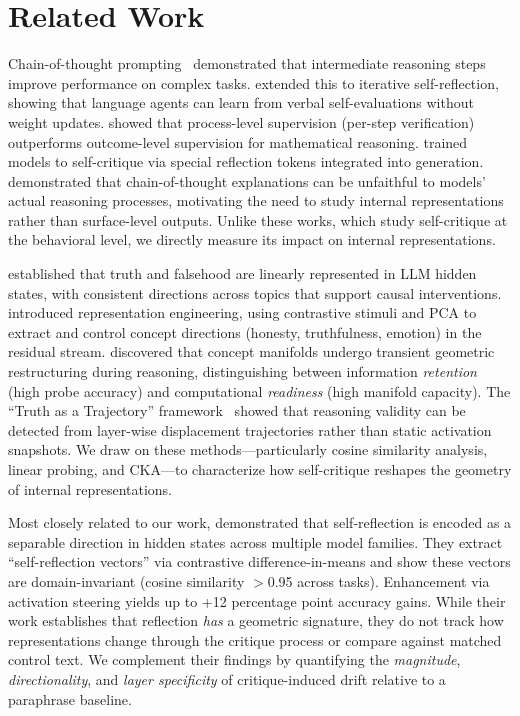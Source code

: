 \section{Related Work}
\label{sec:related}

Chain-of-thought prompting~\citep{wei2022chain} demonstrated that intermediate reasoning steps improve performance on complex tasks. \citet{shinn2023reflexion} extended this to iterative self-reflection, showing that language agents can learn from verbal self-evaluations without weight updates. \citet{lightman2023lets} showed that process-level supervision (per-step verification) outperforms outcome-level supervision for mathematical reasoning. \citet{asai2023self} trained models to self-critique via special reflection tokens integrated into generation. \citet{turpin2024language} demonstrated that chain-of-thought explanations can be unfaithful to models' actual reasoning processes, motivating the need to study internal representations rather than surface-level outputs. Unlike these works, which study self-critique at the behavioral level, we directly measure its impact on internal representations.

\citet{marks2024geometry} established that truth and falsehood are linearly represented in LLM hidden states, with consistent directions across topics that support causal interventions. \citet{zou2023representation} introduced representation engineering, using contrastive stimuli and PCA to extract and control concept directions (honesty, truthfulness, emotion) in the residual stream. \citet{polo2026emergent} discovered that concept manifolds undergo transient geometric restructuring during reasoning, distinguishing between information \emph{retention} (high probe accuracy) and computational \emph{readiness} (high manifold capacity). The ``Truth as a Trajectory'' framework~\citep{tat2026} showed that reasoning validity can be detected from layer-wise displacement trajectories rather than static activation snapshots. We draw on these methods---particularly cosine similarity analysis, linear probing, and CKA---to characterize how self-critique reshapes the geometry of internal representations.

Most closely related to our work, \citet{zhu2025emergence} demonstrated that self-reflection is encoded as a separable direction in hidden states across multiple model families. They extract ``self-reflection vectors'' via contrastive difference-in-means and show these vectors are domain-invariant (cosine similarity $>$0.95 across tasks). Enhancement via activation steering yields up to +12 percentage point accuracy gains. While their work establishes that reflection \emph{has} a geometric signature, they do not track how representations change through the critique process or compare against matched control text. We complement their findings by quantifying the \emph{magnitude}, \emph{directionality}, and \emph{layer specificity} of critique-induced drift relative to a paraphrase baseline.
